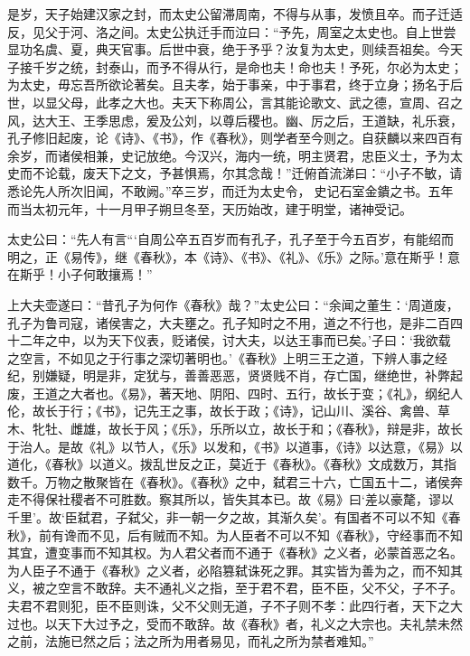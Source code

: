 \documentclass[12pt,UTF8]{ctexbook}
\begin{document}
是岁，天子始建汉家之封，而太史公留滞周南，不得与从事，发愤且卒。而子迁适反，见父于河、洛之间。太史公执迁手而泣曰：“予先，周室之太史也。自上世尝显功名虞、夏，典天官事。后世中衰，绝于予乎？汝复为太史，则续吾祖矣。今天子接千岁之统，封泰山，而予不得从行，是命也夫！命也夫！予死，尔必为太史；为太史，毋忘吾所欲论著矣。且夫孝，始于事亲，中于事君，终于立身；扬名于后世，以显父母，此孝之大也。夫天下称周公，言其能论歌文、武之德，宣周、召之风，达大王、王季思虑，爰及公刘，以尊后稷也。幽、厉之后，王道缺，礼乐衰，孔子修旧起废，论《诗》、《书》，作《春秋》，则学者至今则之。自获麟以来四百有余岁，而诸侯相兼，史记放绝。今汉兴，海内一统，明主贤君，忠臣义士，予为太史而不论载，废天下之文，予甚惧焉，尔其念哉！”迁俯首流涕曰：“小子不敏，请悉论先人所次旧闻，不敢阙。”卒三岁，而迁为太史令，史记石室金鐀之书。五年而当太初元年，十一月甲子朔旦冬至，天历始改，建于明堂，诸神受记。



太史公曰：“先人有言“‘自周公卒五百岁而有孔子，孔子至于今五百岁，有能绍而明之，正《易传》，继《春秋》，本《诗》、《书》、《礼》、《乐》之际。’意在斯乎！意在斯乎！小子何敢攘焉！”



上大夫壶遂曰：“昔孔子为何作《春秋》哉？”太史公曰：“余闻之董生：‘周道废，孔子为鲁司寇，诸侯害之，大夫壅之。孔子知时之不用，道之不行也，是非二百四十二年之中，以为天下仪表，贬诸侯，讨大夫，以达王事而已矣。’子曰：‘我欲载之空言，不如见之于行事之深切著明也。’《春秋》上明三王之道，下辨人事之经纪，别嫌疑，明是非，定犹与，善善恶恶，贤贤贱不肖，存亡国，继绝世，补弊起废，王道之大者也。《易》，著天地、阴阳、四时、五行，故长于变；《礼》，纲纪人伦，故长于行；《书》，记先王之事，故长于政；《诗》，记山川、溪谷、禽兽、草木、牝牡、雌雄，故长于风；《乐》，乐所以立，故长于和；《春秋》，辩是非，故长于治人。是故《礼》以节人，《乐》以发和，《书》以道事，《诗》以达意，《易》以道化，《春秋》以道义。拨乱世反之正，莫近于《春秋》。《春秋》文成数万，其指数千。万物之散聚皆在《春秋》。《春秋》之中，弑君三十六，亡国五十二，诸侯奔走不得保社稷者不可胜数。察其所以，皆失其本已。故《易》曰‘差以豪氂，谬以千里’。故‘臣弑君，子弑父，非一朝一夕之故，其渐久矣’。有国者不可以不知《春秋》，前有谗而不见，后有贼而不知。为人臣者不可以不知《春秋》，守经事而不知其宜，遭变事而不知其权。为人君父者而不通于《春秋》之义者，必蒙首恶之名。为人臣子不通于《春秋》之义者，必陷篡弑诛死之罪。其实皆为善为之，而不知其义，被之空言不敢辞。夫不通礼义之指，至于君不君，臣不臣，父不父，子不子。夫君不君则犯，臣不臣则诛，父不父则无道，子不子则不孝：此四行者，天下之大过也。以天下大过予之，受而不敢辞。故《春秋》者，礼义之大宗也。夫礼禁未然之前，法施已然之后；法之所为用者易见，而礼之所为禁者难知。”
\end{document}
